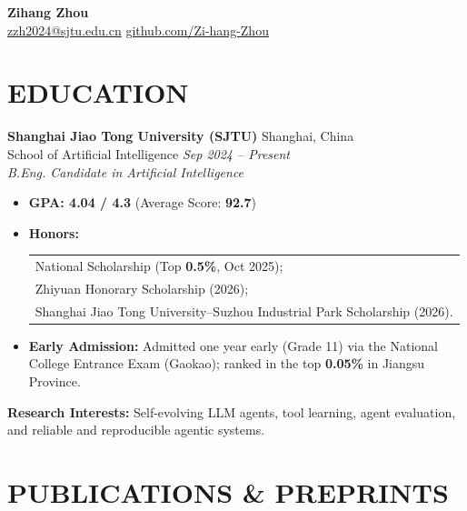 \documentclass[a4paper,11pt]{article}
\newcommand{\resheading}[1]{\section*{#1}}
\begin{document}
\begin{center}
    {\LARGE \textbf{Zihang Zhou}} \\
    \href{mailto:zzh2024@sjtu.edu.cn}{zzh2024@sjtu.edu.cn}
    \enspace\textbullet\enspace
    \href{https://github.com/Zi-Hang-Zhou}{github.com/Zi-hang-Zhou}
\end{center}
\vspace{-6pt}

\resheading{EDUCATION}

\textbf{Shanghai Jiao Tong University (SJTU)}
\hfill Shanghai, China \\
School of Artificial Intelligence
\hfill \emph{Sep 2024 -- Present} \\
\emph{B.Eng. Candidate in Artificial Intelligence}
\begin{itemize}
    \item \textbf{GPA: 4.04 / 4.3}
    (Average Score: \textbf{92.7})
    \item \textbf{Honors:}
    \begin{tabular}[t]{@{}l@{}}
    National Scholarship (Top \textbf{0.5\%}, Oct 2025); \\
    Zhiyuan Honorary Scholarship (2026); \\
    Shanghai Jiao Tong University--Suzhou Industrial Park Scholarship (2026).
    \end{tabular}
    \item \textbf{Early Admission:} Admitted one year early
    (Grade 11) via the National College Entrance Exam (Gaokao);
    ranked in the top \textbf{0.05\%} in Jiangsu Province.

\end{itemize}

\vspace{2pt}
\textbf{Research Interests:}
Self-evolving LLM agents, tool learning, agent evaluation,
and reliable and reproducible agentic systems.
\resheading{PUBLICATIONS \& PREPRINTS}
\end{document}
